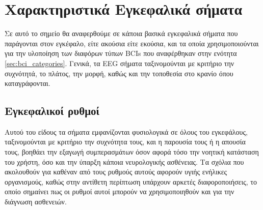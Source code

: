 \documentclass[11pt,a4paper,english,greek,twoside]{../Thesis}
\begin{document}
\section{Χαρακτηριστικά Εγκεφαλικά σήματα}
  \par Σε αυτό το σημείο θα αναφερθούμε σε κάποια βασικά εγκεφαλικά σήματα που παράγονται στον εγκέφαλο, είτε ακούσια είτε εκούσια, και τα οποία χρησιμοποιούνται για την υλοποίηση των διαφόρων τύπων BCIs που αναφέρθηκαν στην ενότητα \ref{sec:bci_categories}. Γενικά, τα EEG σήματα ταξινομούνται με κριτήριο την συχνότητά, το πλάτος, την μορφή, καθώς και την τοποθεσία στο κρανίο όπου καταγράφονται.
  
  \subsection{Εγκεφαλικοί ρυθμοί}
    \par Αυτού του είδους τα σήματα εμφανίζονται φυσιολογικά σε όλους του εγκεφάλους, ταξινομούνται με κριτήριο την συχνότητα τους, και η παρουσία τους ή η απουσία τους, βοηθάει την εξαγωγή συμπερασμάτων όσον αφορά τόσο την νοητική κατάσταση του χρήστη, όσο και την ύπαρξη κάποια νευρολογικής ασθένειας. Τα σχόλια που ακολουθούν για καθέναν από τους ρυθμούς αυτούς αφορούν υγιής ενήλικες οργανισμούς, καθώς στην αντίθετη περίπτωση υπάρχουν αρκετές διαφοροποιήσεις, το οποίο σημαίνει πως οι ρυθμοί αυτοί μπορούν να χρησιμοποιηθούν και για την διάγνωση ασθενειών. 
\end{document}

